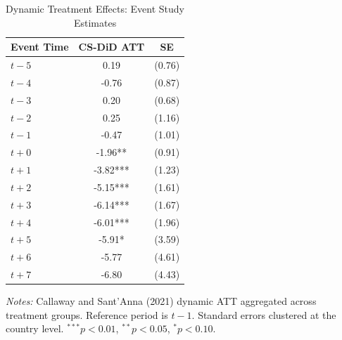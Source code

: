\begin{table}[htbp]
\centering
\caption{Dynamic Treatment Effects: Event Study Estimates}
\label{tab:event_study}
\begin{tabular}{lcc}
\hline\hline
Event Time & CS-DiD ATT & SE \\
\hline
$t-5$ & 0.19 & (0.76) \\
$t-4$ & -0.76 & (0.87) \\
$t-3$ & 0.20 & (0.68) \\
$t-2$ & 0.25 & (1.16) \\
$t-1$ & -0.47 & (1.01) \\
$t+0$ & -1.96** & (0.91) \\
$t+1$ & -3.82*** & (1.23) \\
$t+2$ & -5.15*** & (1.61) \\
$t+3$ & -6.14*** & (1.67) \\
$t+4$ & -6.01*** & (1.96) \\
$t+5$ & -5.91* & (3.59) \\
$t+6$ & -5.77 & (4.61) \\
$t+7$ & -6.80 & (4.43) \\
\hline\hline
\end{tabular}
\begin{tablenotes}
\item \textit{Notes:} Callaway and Sant'Anna (2021) dynamic ATT aggregated across treatment groups. Reference period is $t-1$. Standard errors clustered at the country level. $^{***}p<0.01$, $^{**}p<0.05$, $^{*}p<0.10$.
\end{tablenotes}
\end{table}
